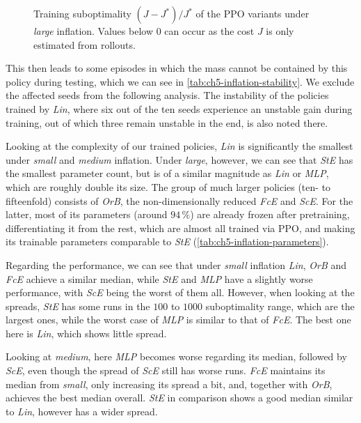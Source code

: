 \begin{figure}[htbp]
  \centering
  \caption{Training suboptimality $(J - J^{*})/J^{*}$ of the PPO variants under \emph{large} inflation.
  Values below $0$ can occur as the cost $J$ is only estimated from rollouts.}
  \label{fig:rl-large-curves}
\end{figure}

This then leads to some episodes in which the mass cannot be contained by this policy during
testing, which we can see in \cref{tab:ch5-inflation-stability}. We exclude the affected
seeds from the following analysis. The instability of the policies trained by \emph{Lin}, where
six out of the ten seeds experience an unstable gain during training, out of which three remain unstable in the
end, is also noted there.



Looking at the complexity of our trained policies, \emph{Lin} is significantly
the smallest under \emph{small} and \emph{medium} inflation.
Under \emph{large}, however, we can see that \emph{StE}
has the smallest parameter count, but is of a similar magnitude as \emph{Lin} or \emph{MLP}, which are roughly
double its size.
The group of much larger policies (ten- to fifteenfold) consists of \emph{OrB}, the non-dimensionally reduced \emph{FcE}
and \emph{ScE}. For the latter, most of its parameters (around $94\,\%$) are already frozen after
pretraining, differentiating it from the rest, which are almost all trained via PPO, and making its trainable parameters
comparable to \emph{StE} (\cref{tab:ch5-inflation-parameters}).



Regarding the performance, we can see that under \emph{small} inflation \emph{Lin}, \emph{OrB}
and \emph{FcE} achieve a similar median,
while \emph{StE} and \emph{MLP} have a slightly worse performance,
with \emph{ScE} being the worst of them all. However, when looking at the spreads,
\emph{StE} has some runs in the $100$ to $1000$ suboptimality range, which are the largest ones, while
the worst case of \emph{MLP} is similar to that of \emph{FcE}. The best one here
is \emph{Lin}, which shows little spread.

Looking at \emph{medium}, here \emph{MLP} becomes worse regarding its median, followed by \emph{ScE}, even though
the spread of \emph{ScE} still has worse runs. \emph{FcE} maintains its median from
\emph{small}, only increasing its spread a bit, and, together with \emph{OrB}, achieves the best median overall. \emph{StE}
in comparison shows a good median similar to \emph{Lin}, however has a wider spread.

